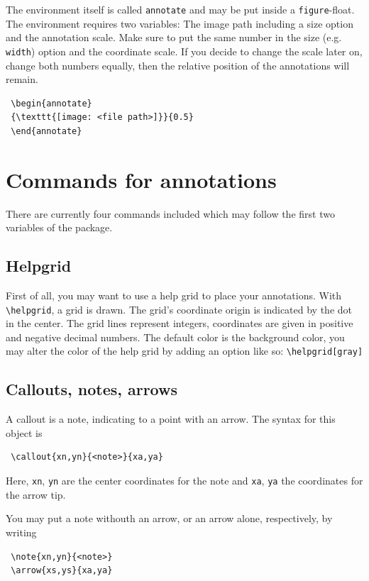 \documentclass[a4paper,11pt]{article}
\begin{document}
The environment itself is called \texttt{annotate} and may be put inside a \texttt{figure}-float. The environment requires two variables: The image path including a size option and the annotation scale. Make sure to put the same number in the size (e.g. \texttt{width}) option and the coordinate scale. If you decide to change the scale later on, change both numbers equally, then the relative position of the annotations will remain.

\begin{lstlisting}
 \begin{annotate}
 {\texttt{[image: <file path>]}}{0.5}
 \end{annotate}
\end{lstlisting}

\section{Commands for annotations}
There are currently four commands included which may follow the first two variables of the package.

\subsection{Helpgrid}
First of all, you may want to use a help grid to place your annotations. With \texttt{\textbackslash helpgrid}, a grid is drawn. The grid's coordinate origin is indicated by the dot in the center. The grid lines represent integers, coordinates are given in positive and negative decimal numbers. The default color is the background color, you may alter the color of the help grid by adding an option like so: \texttt{\textbackslash helpgrid[gray]}

\subsection{Callouts, notes, arrows }
A callout is a note, indicating to a point with an arrow. The syntax for this object is
\begin{lstlisting}
 \callout{xn,yn}{<note>}{xa,ya}
\end{lstlisting}
Here, \texttt{xn}, \texttt{yn} are the center coordinates for the note and \texttt{xa}, \texttt{ya} the coordinates for the arrow tip.

You may put a note withouth an arrow, or an arrow alone, respectively, by writing
\begin{lstlisting}
 \note{xn,yn}{<note>}
 \arrow{xs,ys}{xa,ya}
\end{lstlisting}
\end{document}
